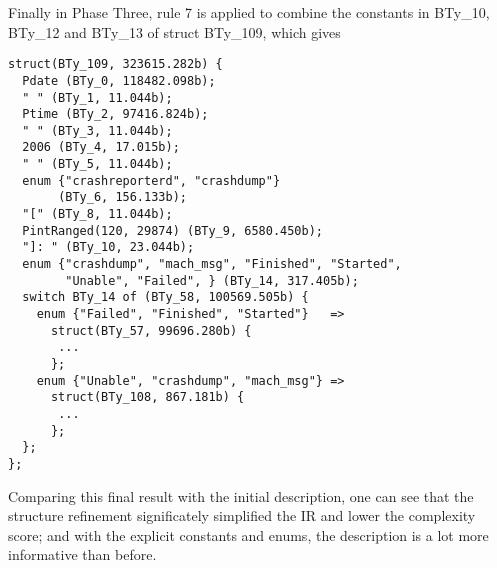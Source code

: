 Finally in Phase Three, rule 7 is applied to combine the constants in BTy\_10,
BTy\_12 and BTy\_13 of struct BTy\_109, which gives 

\begin{verbatim}
struct(BTy_109, 323615.282b) {
  Pdate (BTy_0, 118482.098b);
  " " (BTy_1, 11.044b);
  Ptime (BTy_2, 97416.824b);
  " " (BTy_3, 11.044b);
  2006 (BTy_4, 17.015b);
  " " (BTy_5, 11.044b);
  enum {"crashreporterd", "crashdump"} 
       (BTy_6, 156.133b);
  "[" (BTy_8, 11.044b);
  PintRanged(120, 29874) (BTy_9, 6580.450b);
  "]: " (BTy_10, 23.044b);
  enum {"crashdump", "mach_msg", "Finished", "Started", 
        "Unable", "Failed", } (BTy_14, 317.405b);
  switch BTy_14 of (BTy_58, 100569.505b) {
    enum {"Failed", "Finished", "Started"}   => 
      struct(BTy_57, 99696.280b) {
       ...
      };
    enum {"Unable", "crashdump", "mach_msg"} =>
      struct(BTy_108, 867.181b) {
       ...
      };
  };
};
\end{verbatim}

Comparing this final result with the initial description, one can see that
the structure refinement significately simplified the IR and lower the
complexity score; and with
the explicit constants and enums, the description is a lot more
informative than before.
